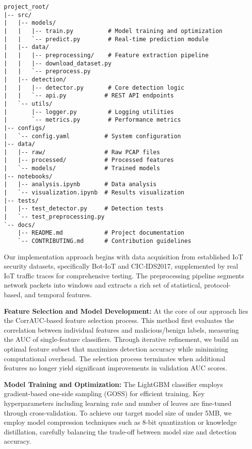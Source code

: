\documentclass[12pt]{article}
\begin{document}
\begin{lstlisting}[basicstyle=\ttfamily\small]
project_root/
|-- src/
|   |-- models/
|   |   |-- train.py          # Model training and optimization
|   |   `-- predict.py        # Real-time prediction module
|   |-- data/
|   |   |-- preprocessing/    # Feature extraction pipeline
|   |   |-- download_dataset.py
|   |   `-- preprocess.py
|   |-- detection/
|   |   |-- detector.py       # Core detection logic
|   |   `-- api.py           # REST API endpoints
|   `-- utils/
|       |-- logger.py         # Logging utilities
|       `-- metrics.py        # Performance metrics
|-- configs/
|   `-- config.yaml          # System configuration
|-- data/
|   |-- raw/                 # Raw PCAP files
|   |-- processed/           # Processed features
|   `-- models/              # Trained models
|-- notebooks/
|   |-- analysis.ipynb       # Data analysis
|   `-- visualization.ipynb  # Results visualization
|-- tests/
|   |-- test_detector.py     # Detection tests
|   `-- test_preprocessing.py
`-- docs/
    |-- README.md            # Project documentation
    `-- CONTRIBUTING.md      # Contribution guidelines
\end{lstlisting}

Our implementation approach begins with data acquisition from established IoT security datasets, specifically Bot-IoT and CIC-IDS2017, supplemented by real IoT traffic traces for comprehensive testing. The preprocessing pipeline segments network packets into windows and extracts a rich set of statistical, protocol-based, and temporal features.

\textbf{Feature Selection and Model Development:} At the core of our approach lies the CorrAUC-based feature selection process. This method first evaluates the correlation between individual features and malicious/benign labels, measuring the AUC of single-feature classifiers. Through iterative refinement, we build an optimal feature subset that maximizes detection accuracy while minimizing computational overhead. The selection process terminates when additional features no longer yield significant improvements in validation AUC scores.

\textbf{Model Training and Optimization:} The LightGBM classifier employs gradient-based one-side sampling (GOSS) for efficient training. Key hyperparameters including learning rate and number of leaves are fine-tuned through cross-validation. To achieve our target model size of under 5MB, we employ model compression techniques such as 8-bit quantization or knowledge distillation, carefully balancing the trade-off between model size and detection accuracy.
\end{document}

